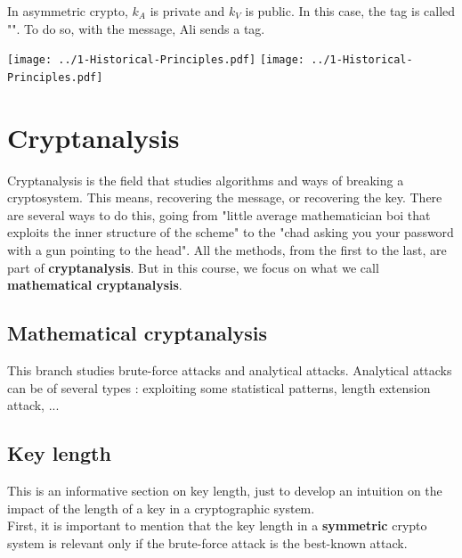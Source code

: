 \documentclass[a4paper, 12pt]{book}
\begin{document}
In asymmetric crypto, $k_A$ is private and $k_V$ is public. In this case, the tag is called "".
To do so, with the message, Ali sends a tag. \\

\begin{center}
    \texttt{[image: ../1-Historical-Principles.pdf]}
    \texttt{[image: ../1-Historical-Principles.pdf]}
\end{center}

\section{Cryptanalysis}
Cryptanalysis is the field that studies algorithms and ways of breaking a cryptosystem. This means, recovering the message, or recovering the key. There are several ways to do this, going from "little average mathematician boi that exploits the inner structure of the scheme" to the "chad asking you your password with a gun pointing to the head". All the methods, from the first to the last, are part of \textbf{cryptanalysis}. But in this course, we focus on what we call \textbf{mathematical cryptanalysis}. \\

\subsection{Mathematical cryptanalysis}

This branch studies brute-force attacks and analytical attacks. Analytical attacks can be of several types : exploiting some statistical patterns, length extension attack, ... \\

\subsection{Key length}
This is an informative section on key length, just to develop an intuition on the impact of the length of a key in a cryptographic system. \\

First, it is important to mention that the key length in a \textbf{symmetric} crypto system is relevant only if the brute-force attack is the best-known attack. \\
\end{document}
